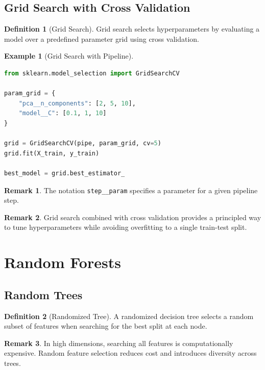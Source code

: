\documentclass[12pt,oneside]{book}
\numberwithin{equation}{section}
\theoremstyle{definition}
\newtheorem{definition}{Definition}[section]
\newtheorem{example}{Example}[section]
\newtheorem{remark}{Remark}[section]
\theoremstyle{plain}
\theoremstyle{remark}
\begin{document}
\subsection{Grid Search with Cross Validation}

\begin{definition}[Grid Search]
Grid search selects hyperparameters by evaluating a model over a predefined parameter grid using cross validation.
\end{definition}

\begin{example}[Grid Search with Pipeline]
\begin{lstlisting}[language=Python]
from sklearn.model_selection import GridSearchCV

param_grid = {
    "pca__n_components": [2, 5, 10],
    "model__C": [0.1, 1, 10]
}

grid = GridSearchCV(pipe, param_grid, cv=5)
grid.fit(X_train, y_train)

best_model = grid.best_estimator_
\end{lstlisting}
\end{example}

\begin{remark}
The notation \texttt{step\_\_param} specifies a parameter for a given pipeline step.
\end{remark}

\begin{remark}
Grid search combined with cross validation provides a principled way to tune hyperparameters while avoiding overfitting to a single train-test split.
\end{remark}

\section{Random Forests}

\subsection{Random Trees}

\begin{definition}[Randomized Tree]
A randomized decision tree selects a random subset of features when searching for the best split at each node.
\end{definition}

\begin{remark}
In high dimensions, searching all features is computationally expensive. Random feature selection reduces cost and introduces diversity across trees.
\end{remark}
\end{document}
